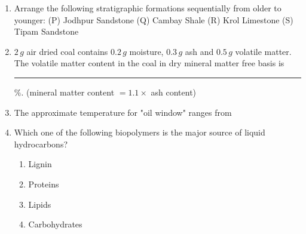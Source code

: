 \documentclass[journal,12pt,onecolumn]{IEEEtran}
\theoremstyle{remark}
\begin{document}
\begin{enumerate}
    \item Arrange the following stratigraphic formations sequentially from older to younger: (P) Jodhpur Sandstone (Q) Cambay Shale (R) Krol Limestone (S) Tipam Sandstone \hfill{}
        \begin{enumerate} 
        \end{enumerate}
    
    \item $2\,g$ air dried coal contains $0.2\,g$ moisture, $0.3\,g$ ash and $0.5\,g$ volatile matter. The volatile matter content in the coal in dry mineral matter free  basis is \rule{3cm}{0.15mm} $\%$. (mineral matter content $=1.1 \times$ ash content) \hfill{}
    
    \item The approximate temperature for "oil window" ranges from \hfill{}
        \begin{enumerate} 
        \end{enumerate}
    
    \item Which one of the following biopolymers is the major source of liquid hydrocarbons? \hfill{}
        \begin{enumerate} 
            \item Lignin
            \item Proteins
            \item Lipids
            \item Carbohydrates
        \end{enumerate}
    

\end{enumerate}
\end{document}
